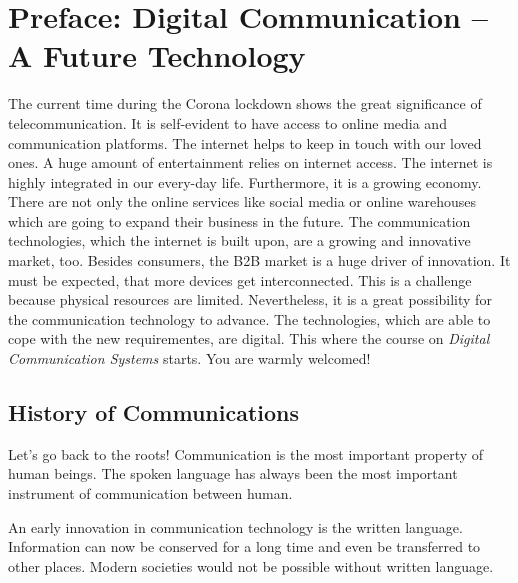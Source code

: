 %
%
%

{}
\chapter*{Preface: Digital Communication -- A Future Technology}

\begin{refsection}

The current time during the Corona lockdown shows the great significance of telecommunication. It is self-evident to have access to online media and communication platforms. The internet helps to keep in touch with our loved ones. A huge amount of entertainment relies on internet access. The internet is highly integrated in our every-day life. Furthermore, it is a growing economy. There are not only the online services like social media or online warehouses which are going to expand their business in the future. The communication technologies, which the internet is built upon, are a growing and innovative market, too. Besides consumers, the \ac{B2B} market is a huge driver of innovation. It must be expected, that more devices get interconnected. This is a challenge because physical resources are limited. Nevertheless, it is a great possibility for the communication technology to advance. The technologies, which are able to cope with the new requirementes, are digital. This where the course on \emph{Digital Communication Systems} starts. You are warmly welcomed!

\section*{History of Communications}

Let's go back to the roots! Communication is the most important property of human beings. The spoken language has always been the most important instrument of communication between human.

An early innovation in communication technology is the written language. Information can now be conserved for a long time and even be transferred to other places. Modern societies would not be possible without written language.


\end{refsection}
